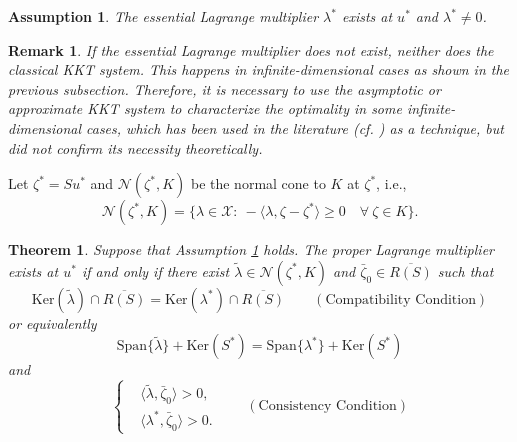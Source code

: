 \documentclass[leqno]{amsart}
\newtheorem{theorem}{Theorem}[section]
\newtheorem{Remark}[Theorem]{Remark}
\newtheorem{Assumption}[Theorem]{Assumption}
\theoremstyle{definition}
\begin{document}
\begin{Assumption}\label{assum:e_elm}
The essential Lagrange multiplier $\lambda^*$ exists at $u^*$ and $\lambda^* \neq 0$.
\end{Assumption}

\begin{Remark}
If the essential Lagrange multiplier does not exist, neither does the classical KKT system. This happens in infinite-dimensional cases as shown in the previous subsection. Therefore, it is necessary to use the asymptotic or approximate KKT system to characterize the optimality in some infinite-dimensional cases, which has been used in the literature (cf. \cite{andreani2019sequential, borgens2020new, jeyakumar2003new, steck2018lagrange, thibault1997sequential}) as a technique, but did not confirm its necessity theoretically. 
\end{Remark}

Let $\zeta^* = Su^*$ and $\mathcal{N}(\zeta^*,K)$ be the normal cone to $K$ at $\zeta^*$, i.e., 
$$\mathcal{N}(\zeta^*,K) = \{\lambda\in \mathcal{X}:\ -\langle \lambda, \zeta - \zeta^*\rangle \geq 0\quad \forall\ \zeta \in K\}.$$

\begin{theorem}\label{thm:pLM_exist}
Suppose that Assumption \ref{assum:e_elm} holds. The proper Lagrange multiplier exists at $u^*$ if and only if there exist  $\tilde{\lambda}\in \mathcal{N}(\zeta^*,K)$ and $\bar{\zeta}_0\in \overline{R(S)}$ such that
\begin{equation}\label{eq:LM_iff1}
 \mathrm{Ker}(\tilde{\lambda})\cap \overline{R(S)}=  \mathrm{Ker}(\lambda^*)\cap \overline{R(S)}\quad\quad (\mbox{Compatibility\ Condition})
 \end{equation}
 or equivalently
\begin{equation}\nonumber
\mathrm{Span}\{\tilde{\lambda}\} + \mathrm{Ker}(S^*) = \mathrm{Span}\{\lambda^*\} + \mathrm{Ker}(S^*)
 \end{equation}
and 
 \begin{equation}\label{eq:LM_iff2}
 \left\{
 \begin{aligned}
 & \langle\tilde{\lambda}, \bar{\zeta}_0 \rangle > 0,\\
 & \langle \lambda^*, \bar{\zeta}_0 \rangle > 0. 
 \end{aligned}
 \right.
 \quad\quad  (\mbox{Consistency\ Condition})
 \end{equation}
\end{theorem}
\end{document}
